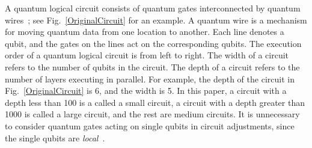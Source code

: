 \documentclass[journal]{IEEEtran}
\newcommand{\leaveout}[1]{}
\begin{document}
A quantum logical circuit 
consists of quantum gates interconnected by quantum wires~\cite{Daei2020}; see Fig.~\ref{OriginalCircuit} for an example.
A quantum wire is a mechanism for moving quantum data from one location to another.
Each line denotes a qubit, and the gates on the lines act on the corresponding qubits.
The execution order of a quantum logical circuit  is from left to right.
The width %
of a circuit refers to the number of qubits in the circuit.
The depth %
of a circuit refers to the number of layers executing in parallel.
For example, the depth of the circuit in Fig.~\ref{OriginalCircuit} is 6, and the width is 5.
In this paper, a circuit with a depth less than 100 is a called a small circuit,
a circuit with a depth greater than 1000 is called a large circuit,
and the rest are medium circuits.
It is unnecessary to consider quantum gates acting on single qubits in circuit adjustments, since the single qubits are \textit{local}~\cite{Shafaei2013}.
\end{document}

